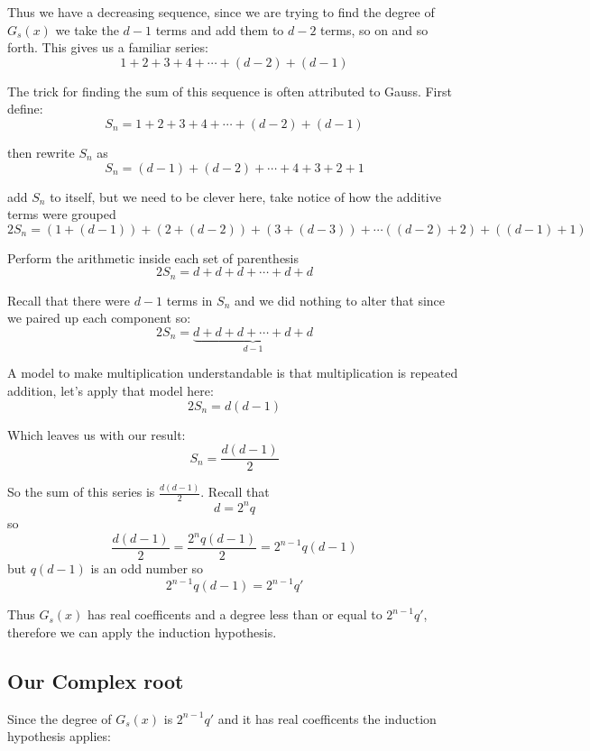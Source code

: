 \documentclass[12pt]{article}
\begin{document}
Thus we have a decreasing sequence, since we are trying to find the degree of $G_s(x)$ we take the $d-1$ terms and add them to $d-2$ terms, so on and so forth.  This gives us a familiar series:
$$ 1 + 2 + 3 + 4 + \cdots + (d-2) + (d-1)$$

The trick for finding the sum of this sequence is often attributed to Gauss.
First define: $$S_n = 1 + 2 + 3 + 4 + \cdots + (d-2) + (d-1)$$

then rewrite $S_n$ as
$$S_n = (d-1) + (d-2) + \cdots + 4 + 3 + 2 + 1$$

add $S_n$ to itself, but we need to be clever here, take notice of how the additive terms were grouped
$$2 S_n = (1 + (d-1)) + (2+(d-2)) + (3 + (d-3)) + \cdots ((d-2) +2) + ((d-1)+1)$$

Perform the arithmetic inside each set of parenthesis
$$ 2 S_n = d + d + d + \cdots + d + d$$

Recall that there were $d-1$ terms in $S_n$ and we did nothing to alter that since we paired up each component so:
$$2 S_n = \underbrace{d + d + d + \cdots + d + d}_{d-1}$$

A model to make multiplication understandable is that multiplication is repeated addition, let's apply that model here:
$$2 S_n = d(d-1)$$

Which leaves us with our result:
$$S_n = \frac{d(d-1)}{2}$$


So the sum of this series is $\frac{d(d-1)}{2}$.  Recall that 
$$d=2^n q$$
 so 
 $$\frac{d(d-1)}{2} = \frac{2^n q (d-1)}{2} = 2^{n-1}q(d-1)$$
  but $q(d-1)$ is an odd number so 
  $$2^{n-1}q(d-1) = 2^{n-1}q'$$

Thus $G_s(x)$ has real coefficents and a degree less than or equal to $2^{n-1}q'$, therefore we can apply the induction hypothesis.

\subsection*{Our Complex root}
Since the degree of $G_s(x)$ is $2^{n-1}q'$ and it has real coefficents the  induction hypothesis applies:

\begin{center}
\end{center}
\end{document}
